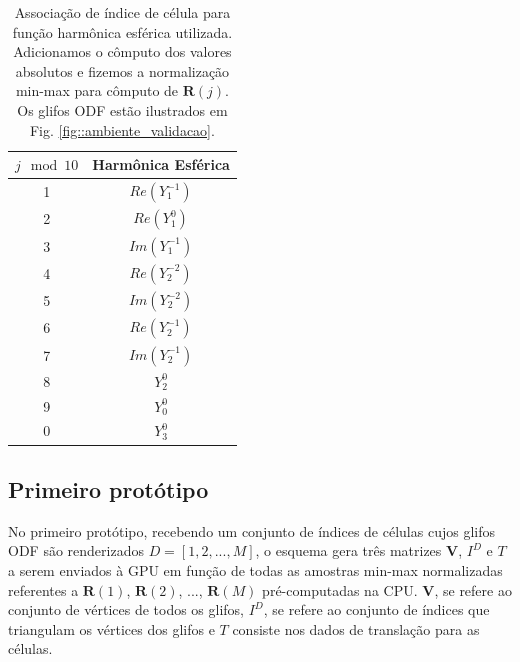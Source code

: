 \documentclass[
    12pt,                %
    oneside,            %
    a4paper,            %
    english,            %
    french,                %
    spanish,            %
    brazil                %
    ]{abntex2}
\begin{document}
\begin{table}[ht]
\centering
\begin{tabular}{cc}
$j \mod 10$ & Harmônica Esférica \\ \hline
1 & $Re(Y_1^{-1})$  \\
2 & $Re(Y_1^0)$     \\
3 & $Im(Y_1^{-1})$  \\
4 & $Re(Y_2^{-2})$  \\
5 & $Im(Y_2^{-2})$  \\
6 & $Re(Y_2^{-1})$  \\
7 & $Im(Y_2^{-1})$  \\
8 & $Y_2^0$         \\
9 & $Y_0^0$         \\
0 & $Y_3^0$        
\end{tabular}
\caption{Associação de índice de célula para função harmônica esférica utilizada. Adicionamos o cômputo dos valores absolutos e fizemos a normalização min-max para cômputo de $\boldsymbol{R}(j)$. Os glifos ODF estão ilustrados em Fig. \ref{fig::ambiente_validacao}.}
\label{tab::harmonicas_esfericas}
\end{table}




\subsection{Primeiro protótipo}
\label{sec::primeiro_prototipo}

No primeiro protótipo, recebendo um conjunto de índices de células cujos glifos ODF são renderizados $D = [
1,
2, ..., 
M
]$, o esquema gera três matrizes $\mathbf{V}$, $I^D$ e $T$ a serem enviados à GPU em função de todas as amostras min-max normalizadas referentes a
$\boldsymbol{R}(1)$,
$\boldsymbol{R}(2)$, ...,
$\boldsymbol{R}(M)$ pré-computadas na CPU. $\mathbf{V}$, se refere ao conjunto de vértices de todos os glifos, $I^D$, se refere ao conjunto de índices que triangulam os vértices dos glifos e $T$ consiste nos dados de translação para as células.


\end{document}
